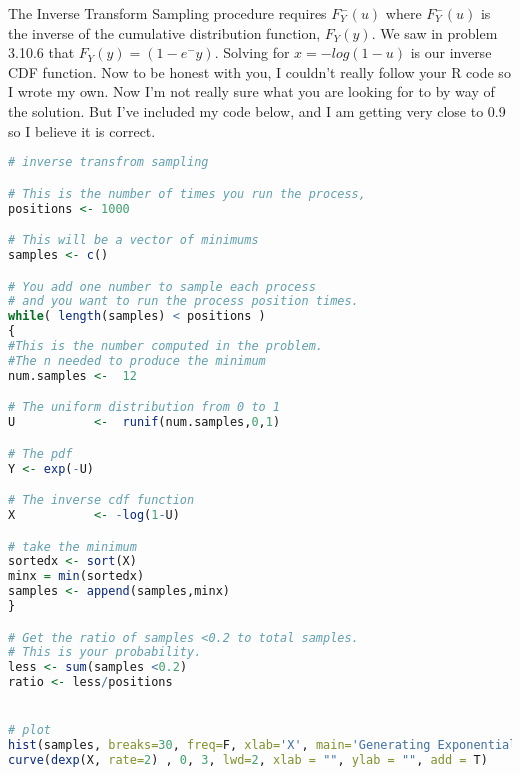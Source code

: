 \documentclass[12pt]{article}
\newenvironment{problem}[2][Problem]{\begin{trivlist}
\item[\hskip \labelsep {\bfseries #1}\hskip \labelsep {\bfseries #2.}]}{\end{trivlist}}
\begin{document}
\begin{problem}{Assignment} The Inverse Transform Sampling procedure requires $F^-_Y(u)$ where $F^-_Y(u)$ is the inverse of the cumulative distribution function, $F_Y(y)$. We saw in problem 3.10.6 that $F_Y(y) = (1-e^-y)$. Solving for $x=-log(1-u)$ is our inverse CDF function. Now to be honest with you, I couldn't really follow your R code so I wrote my own. Now I'm not really sure what you are looking for to by way of the solution. But I've included my code below, and I am getting very close to 0.9 so I believe it is correct. 
\begin{lstlisting}[language=R]
# inverse transfrom sampling

# This is the number of times you run the process, 
positions <- 1000

# This will be a vector of minimums
samples <- c()

# You add one number to sample each process
# and you want to run the process position times. 
while( length(samples) < positions )
{
#This is the number computed in the problem. 
#The n needed to produce the minimum
num.samples <-  12 

# The uniform distribution from 0 to 1
U           <-  runif(num.samples,0,1)

# The pdf 
Y <- exp(-U)

# The inverse cdf function
X           <- -log(1-U)

# take the minimum
sortedx <- sort(X) 
minx = min(sortedx)
samples <- append(samples,minx)
}

# Get the ratio of samples <0.2 to total samples.
# This is your probability. 
less <- sum(samples <0.2)
ratio <- less/positions


# plot
hist(samples, breaks=30, freq=F, xlab='X', main='Generating Exponential R.V.')
curve(dexp(X, rate=2) , 0, 3, lwd=2, xlab = "", ylab = "", add = T)

\end{lstlisting}

\end{problem}
\end{document}

